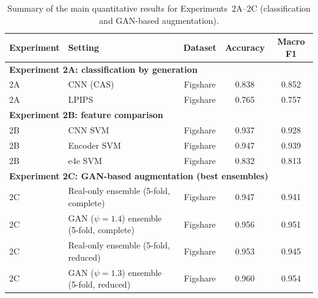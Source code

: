 \begin{table}[H]
\centering
\small
\caption{Summary of the main quantitative results for Experiments~2A--2C (classification and GAN-based augmentation).}
\label{tab:global_summary_exp2_all}
\begin{tabular}{llccc}
\toprule
Experiment & Setting & Dataset & Accuracy & Macro F1 \\
\midrule
\multicolumn{5}{l}{\textbf{Experiment 2A: classification by generation}} \\
2A & CNN (CAS) & Figshare & 0.838  & 0.852 \\
2A & LPIPS & Figshare & 0.765  & 0.757 \\
\midrule
\multicolumn{5}{l}{\textbf{Experiment 2B: feature comparison}} \\
2B & CNN SVM      & Figshare & 0.937 & 0.928 \\
2B & Encoder SVM  & Figshare & 0.947 & 0.939 \\
2B & e4e SVM      & Figshare & 0.832 & 0.813 \\
\midrule
\multicolumn{5}{l}{\textbf{Experiment 2C: GAN-based augmentation (best ensembles)}} \\
2C & Real-only ensemble (5-fold, complete)          & Figshare & 0.947 & 0.941 \\
2C & GAN ($\psi=1.4$) ensemble (5-fold, complete)   & Figshare & 0.956 & 0.951 \\
2C & Real-only ensemble (5-fold, reduced)           & Figshare & 0.953 & 0.945 \\
2C & GAN ($\psi=1.3$) ensemble (5-fold, reduced)    & Figshare & 0.960 & 0.954 \\
\bottomrule
\end{tabular}
\end{table}


